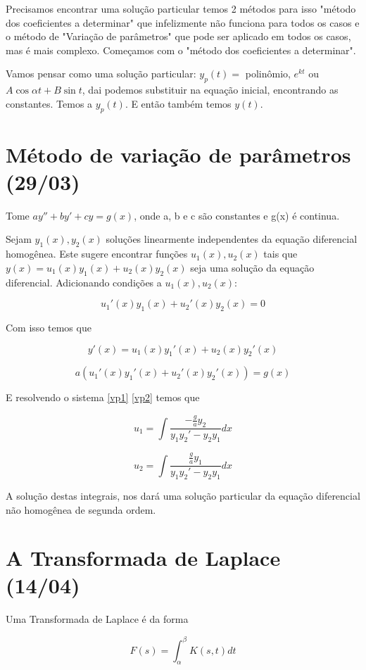 \documentclass{article}
\begin{document}
Precisamos encontrar uma solução particular temos 2 métodos para isso "método dos coeficientes a determinar" que infelizmente não funciona para todos os casos e o método de "Variação de parâmetros" que pode ser aplicado em todos os casos, mas é mais complexo. Começamos com o "método dos coeficientes a determinar".

Vamos pensar como uma solução particular: $y_p(t) = $ polinômio, $e^{k t}$ ou $A \cos \alpha t + B \sin t$, dai podemos substituir na equação inicial, encontrando as constantes. Temos a $y_p(t)$. E então também temos $y(t)$.

\section*{Método de variação de parâmetros (29/03)}
\label{s9}
Tome $a y'' + b y' + c y = g(x)$, onde a, b e c são constantes e g(x) é continua.

Sejam $y_1(x), y_2(x)$ soluções linearmente independentes da equação diferencial homogênea. Este sugere encontrar funções $u_1(x), u_2(x)$ tais que $y(x) = u_1(x) y_1(x) + u_2(x) y_2(x)$ seja uma solução da equação diferencial. Adicionando condições a $u_1(x), u_2(x)$:

\begin{equation}\label{vp1}
    u_1'(x) y_1(x) + u_2'(x) y_2(x) = 0
\end{equation}

Com isso temos que 

$$y'(x) = u_1(x) y_1'(x) + u_2(x) y_2'(x)$$

\begin{equation}\label{vp2}
    a(u_1'(x) y_1'(x) + u_2'(x) y_2'(x)) = g(x)
\end{equation}

E resolvendo o sistema \ref{vp1} \ref{vp2} temos que

$$u_1 = \int \dfrac{- \frac{g}{a} y_2}{y_1 y_2' - y_2 y_1} d x$$

$$u_2 = \int \dfrac{\frac{g}{a} y_1}{y_1 y_2' - y_2 y_1} d x$$

A solução destas integrais, nos dará uma solução particular da equação diferencial não homogênea de segunda ordem.

\section*{A Transformada de Laplace (14/04)}
\label{s10}
Uma Transformada de Laplace é da forma

$$F(s) = \int_\alpha^\beta K(s, t) d t$$
\end{document}
